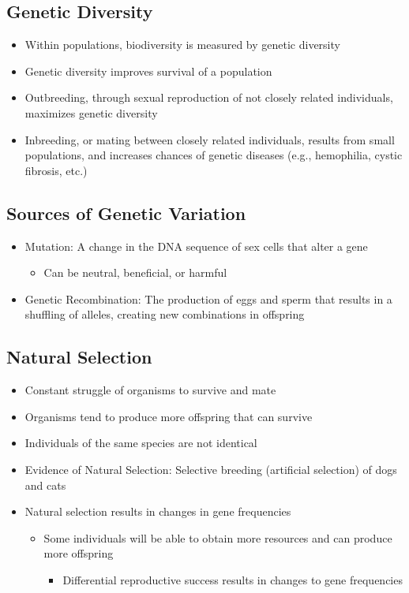 \documentclass[11pt]{article}
\begin{document}
\subsection{Genetic Diversity}
\label{sec:orge87fbc8}
\begin{itemize}
\item Within populations, biodiversity is measured by genetic diversity
\item Genetic diversity improves survival of a population
\item Outbreeding, through sexual reproduction of not closely related individuals, maximizes genetic 
diversity
\item Inbreeding, or mating between closely related individuals, results from small 
populations, and increases chances of genetic diseases (e.g., hemophilia, cystic fibrosis, etc.)
\end{itemize}
\subsection{Sources of Genetic Variation}
\label{sec:org1f2fc9d}
\begin{itemize}
\item Mutation: A change in the DNA sequence of sex cells that alter a gene
\begin{itemize}
\item Can be neutral, beneficial, or harmful
\end{itemize}
\item Genetic Recombination: The production of eggs and sperm that results in a shuffling of 
alleles, creating new combinations in offspring
\end{itemize}
\subsection{Natural Selection}
\label{sec:org06f11a8}
\begin{itemize}
\item Constant struggle of organisms to survive and mate
\item Organisms tend to produce more offspring that can survive
\item Individuals of the same species are not identical
\item Evidence of Natural Selection: Selective breeding (artificial selection) of dogs and cats
\item Natural selection results in changes in gene frequencies
\begin{itemize}
\item Some individuals will be able to obtain more resources and can produce more offspring
\begin{itemize}
\item Differential reproductive success results in changes to gene frequencies
\end{itemize}
\end{itemize}
\end{itemize}
\end{document}
